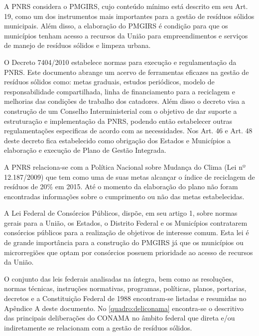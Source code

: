 	A PNRS considera o PMGIRS, cujo conteúdo mínimo está descrito em seu Art. 19, como um dos instrumentos mais importantes para a gestão de resíduos sólidos municipais. Além disso, a elaboração do PMGIRS é condição para que os municípios tenham acesso a recursos da União para empreendimentos e serviços de manejo de resíduos sólidos e limpeza urbana.
	 
	O Decreto 7404/2010 estabelece normas para execução e regulamentação da PNRS. Este documento abrange um acervo de ferramentas eficazes na gestão de resíduos sólidos como: metas graduais, estudos periódicos, modelo de responsabilidade compartilhada, linha de financiamento para a reciclagem e melhorias das condições de trabalho dos catadores. Além disso o decreto visa a construção de um Conselho Interministerial com o objetivo de dar suporte a estruturação e implementação da PNRS, podendo então estabelecer outras regulamentações especificas de acordo com as necessidades. Nos Art. 46 e Art. 48 deste decreto fica estabelecido como obrigação dos Estados e Municípios a elaboração e execução de Plano de Gestão Integrada.
	
	A PNRS relaciona-se com a Política Nacional sobre Mudança do Clima (Lei nº 12.187/2009) que tem como uma de suas metas alcançar o índice de reciclagem de resíduos de 20\% em 2015. Até o momento da elaboração do plano não foram encontradas informações sobre o cumprimento ou não das metas estabelecidas.  
	
	A Lei Federal de Consórcios Públicos, dispõe, em seu artigo 1, sobre normas gerais para a União, os Estados, o Distrito Federal e os Municípios contratarem consórcios públicos para a realização de objetivos de interesse comum. Esta lei é de grande importância para a construção do PMGIRS já que os municípios ou microrregiões que optam por consórcios possuem prioridade ao acesso de recursos da União.
	
	O conjunto das leis federais analisadas na íntegra, bem como as resoluções, normas técnicas, instruções normativas, programas, políticas, planos, portarias, decretos e a Constituição Federal de 1988 encontram-se listadas e resumidas no Apêndice A deste documento. 
	No \autoref{quadro:deliconama} encontra-se o descritivo das principais deliberações do CONAMA no âmbito federal que direta e/ou indiretamente se relacionam com a gestão de resíduos sólidos.
	
